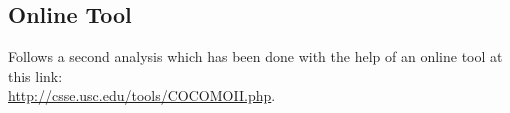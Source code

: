 \documentclass{article}
\begin{document}
		\subsection{Online Tool}
		Follows a second analysis which has been done with the help of an online tool at this link:\\ \href{http://csse.usc.edu/tools/COCOMOII.php}{http://csse.usc.edu/tools/COCOMOII.php}.
		
		\begin{minipage}{\linewidth}
			\vspace{5mm}
			\vspace{5mm}
		\end{minipage}
	
		\begin{minipage}{\linewidth}
			\vspace{5mm}
			\vspace{5mm}
		\end{minipage}
	
\end{document}
